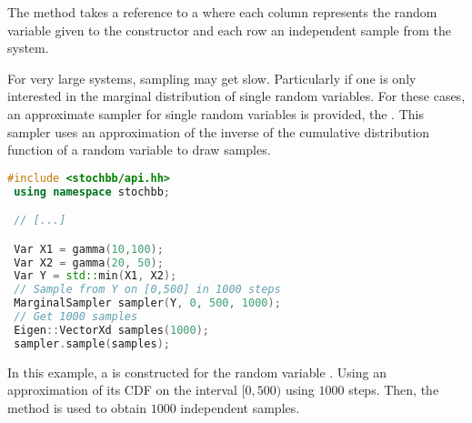 The  method takes a reference to a  where each column
represents the random variable given to the constructor and each row an independent sample from
the system.

For very large systems, sampling may get slow. Particularly if one is only interested
in the marginal distribution of single random variables. For these cases, an approximate sampler
for single random variables is provided, the . This sampler uses an
approximation of the inverse of the cumulative distribution function of a random variable
to draw samples.
\begin{lstlisting}[language=C++]
 #include <stochbb/api.hh>
 using namespace stochbb;

 // [...]

 Var X1 = gamma(10,100);
 Var X2 = gamma(20, 50);
 Var Y = std::min(X1, X2);
 // Sample from Y on [0,500] in 1000 steps
 MarginalSampler sampler(Y, 0, 500, 1000);
 // Get 1000 samples
 Eigen::VectorXd samples(1000);
 sampler.sample(samples);
\end{lstlisting}

In this example, a  is constructed for the random variable . Using an
approximation of its CDF on the interval $[0,500)$ using $1000$ steps. Then, the
 method is used to obtain $1000$ independent samples.


